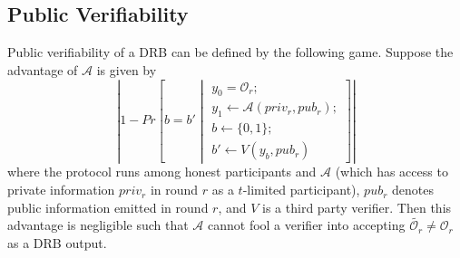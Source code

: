 \documentclass[conference]{IEEEtran}
\theoremstyle{definition}
\theoremstyle{remark}
\begin{document}
\subsection{Public Verifiability}
\label{appendix:pv}
Public verifiability of a DRB can be defined by the following game. Suppose the advantage of $\mathcal{A}$ is given by
\[
\left\lvert 1 - Pr\left[b = b' \middle\vert \begin{array}{l}
y_0 = \mathcal{O}_r;\\
y_1 \leftarrow \mathcal{A}(priv_r, pub_r);\\
b \leftarrow \{0, 1\};\\
b' \leftarrow V(y_b, pub_r)
\end{array}\right]
\right\rvert
\]
where the protocol runs among honest participants and $\mathcal{A}$ (which has access to private information $priv_r$ in round $r$ as a $t$-limited participant), $pub_r$ denotes public information emitted in round $r$, and $V$ is a third party verifier. Then this advantage is negligible such that $\mathcal{A}$ cannot fool a verifier into accepting $\tilde{\mathcal{O}_r} \neq \mathcal{O}_r$ as a DRB output.


\end{document}
